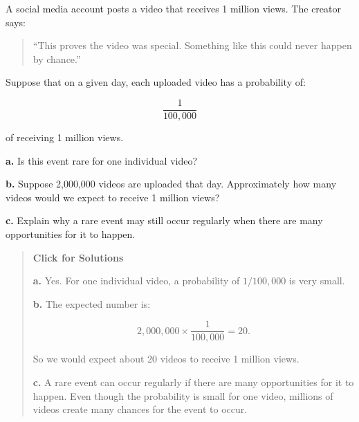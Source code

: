 \documentclass[
  letterpaper,
  DIV=11,
  numbers=noendperiod]{scrreprt}
\begin{document}
\begin{tcolorbox}[enhanced jigsaw, arc=.35mm, bottomrule=.15mm, bottomtitle=1mm, breakable, colback=white, colbacktitle=quarto-callout-note-color!10!white, colframe=quarto-callout-note-color-frame, coltitle=black, left=2mm, leftrule=.75mm, opacityback=0, opacitybacktitle=0.6, rightrule=.15mm, title=\textcolor{quarto-callout-note-color}{\faInfo}\hspace{0.5em}{Question 5}, titlerule=0mm, toprule=.15mm, toptitle=1mm]

A social media account posts a video that receives 1 million views. The
creator says:

\begin{quote}
``This proves the video was special. Something like this could never
happen by chance.''
\end{quote}

Suppose that on a given day, each uploaded video has a probability of:

\[\frac{1}{100{,}000}\]

of receiving 1 million views.

\textbf{a.} Is this event rare for one individual video?

\textbf{b.} Suppose 2,000,000 videos are uploaded that day.
Approximately how many videos would we expect to receive 1 million
views?

\textbf{c.} Explain why a rare event may still occur regularly when
there are many opportunities for it to happen.

\begin{quote}
\textbf{Click for Solutions}

\textbf{a.} Yes. For one individual video, a probability of
\(1/100,000\) is very small.

\textbf{b.} The expected number is:

\[2{,}000{,}000 \times \frac{1}{100{,}000} = 20.\]

So we would expect about 20 videos to receive 1 million views.

\textbf{c.} A rare event can occur regularly if there are many
opportunities for it to happen. Even though the probability is small for
one video, millions of videos create many chances for the event to
occur.
\end{quote}

\end{tcolorbox}
\end{document}
